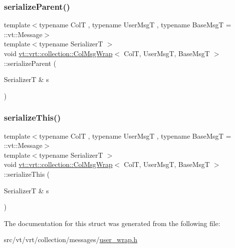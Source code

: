 \subsubsection{\texorpdfstring{serialize\+Parent()}{serializeParent()}}
{\footnotesize\ttfamily template$<$typename ColT , typename User\+MsgT , typename Base\+MsgT  = \+::vt\+::\+Message$>$ \\
template$<$typename SerializerT $>$ \\
void \hyperlink{structvt_1_1vrt_1_1collection_1_1_col_msg_wrap}{vt\+::vrt\+::collection\+::\+Col\+Msg\+Wrap}$<$ ColT, User\+MsgT, Base\+MsgT $>$\+::serialize\+Parent (\begin{DoxyParamCaption}\item[{SerializerT \&}]{s }\end{DoxyParamCaption})\hspace{0.3cm}{\ttfamily [inline]}}

\mbox{\label{structvt_1_1vrt_1_1collection_1_1_col_msg_wrap_a1316131ea77469404fbaee6a176e74dc}} 
\subsubsection{\texorpdfstring{serialize\+This()}{serializeThis()}}
{\footnotesize\ttfamily template$<$typename ColT , typename User\+MsgT , typename Base\+MsgT  = \+::vt\+::\+Message$>$ \\
template$<$typename SerializerT $>$ \\
void \hyperlink{structvt_1_1vrt_1_1collection_1_1_col_msg_wrap}{vt\+::vrt\+::collection\+::\+Col\+Msg\+Wrap}$<$ ColT, User\+MsgT, Base\+MsgT $>$\+::serialize\+This (\begin{DoxyParamCaption}\item[{SerializerT \&}]{s }\end{DoxyParamCaption})\hspace{0.3cm}{\ttfamily [inline]}}



The documentation for this struct was generated from the following file\+:\begin{DoxyCompactItemize}
\item 
src/vt/vrt/collection/messages/\hyperlink{user__wrap_8h}{user\+\_\+wrap.\+h}\end{DoxyCompactItemize}
